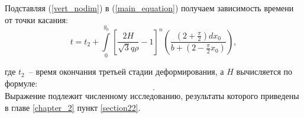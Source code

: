 	Подставляя (\ref{vert_nodim}) в (\ref{main_equation}) получаем зависимость времени от точки касания:
	\begin{equation}
	t = t_2+ \int\limits_0^{y_0}\left[ \dfrac{2H}{\sqrt3 q \rho} -1\right]^n\left(\dfrac{\left( 2+\frac{\pi}{2}\right)dx_0}{b+\left(2-\frac{\pi}{2}x_0\right)}\right),
	\end{equation}
	
где $t_2$~-- время окончания третьей стадии деформирования, а $H$ вычисляется по формуле:
\begin{equation}
.
\end{equation}   
Выражение подлежит численному исследованию, результаты которого приведены в главе \ref{chapter_2} пункт \ref{section22}.